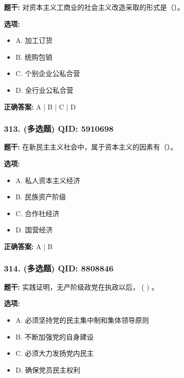 \documentclass[12pt,UTF8]{ctexart}
\begin{document}
\textbf{题干:}
对资本主义工商业的社会主义改造采取的形式是（）。

\textbf{选项:}
\begin{itemize}[leftmargin=*]

  \item A. 加工订货

  \item B. 统购包销

  \item C. 个别企业公私合营

  \item D. 全行业公私合营

\end{itemize}

\textbf{正确答案:}
A | B | C | D

\vspace{0.3em}\hrulefill\vspace{0.7em}

\subsubsection*{313. (多选题) \small QID: 5910698}

\textbf{题干:}
在新民主主义社会中，属于资本主义的因素有（）。

\textbf{选项:}
\begin{itemize}[leftmargin=*]

  \item A. 私人资本主义经济

  \item B. 民族资产阶级

  \item C. 合作社经济

  \item D. 国营经济

\end{itemize}

\textbf{正确答案:}
A | B

\vspace{0.3em}\hrulefill\vspace{0.7em}

\subsubsection*{314. (多选题) \small QID: 8808846}

\textbf{题干:}
实践证明，无产阶级政党在执政以后， ( ) 。

\textbf{选项:}
\begin{itemize}[leftmargin=*]

  \item A. 必须坚持党的民主集中制和集体领导原则

  \item B. 不断加强党的自身建设

  \item C. 必须大力发扬党内民主

  \item D. 确保党员民主权利

\end{itemize}
\end{document}
